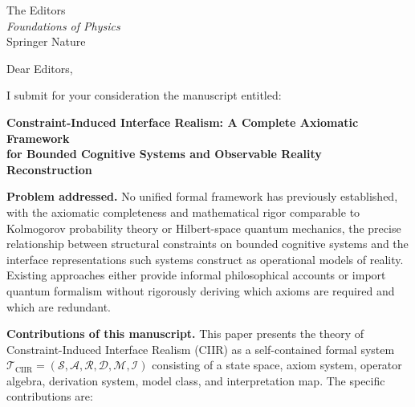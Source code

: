 \documentclass[12pt]{letter}
\begin{document}
\begin{letter}{The Editors\\
\textit{Foundations of Physics}\\
Springer Nature}

\opening{Dear Editors,}

I submit for your consideration the manuscript entitled:

\begin{center}
\textbf{Constraint-Induced Interface Realism: A Complete Axiomatic Framework\\
for Bounded Cognitive Systems and Observable Reality Reconstruction}
\end{center}

\textbf{Problem addressed.}
No unified formal framework has previously established, with the axiomatic
completeness and mathematical rigor comparable to Kolmogorov probability theory
or Hilbert-space quantum mechanics, the precise relationship between structural
constraints on bounded cognitive systems and the interface representations such
systems construct as operational models of reality.  Existing approaches either
provide informal philosophical accounts or import quantum formalism without
rigorously deriving which axioms are required and which are redundant.

\textbf{Contributions of this manuscript.}
This paper presents the theory of Constraint-Induced Interface Realism (CIIR)
as a self-contained formal system $\mathcal{T}_\mathrm{CIIR} = (\mathcal{S},
\mathcal{A}, \mathcal{R}, \mathcal{D}, \mathcal{M}, \mathcal{I})$ consisting
of a state space, axiom system, operator algebra, derivation system, model
class, and interpretation map.  The specific contributions are:


\end{letter}
\end{document}
